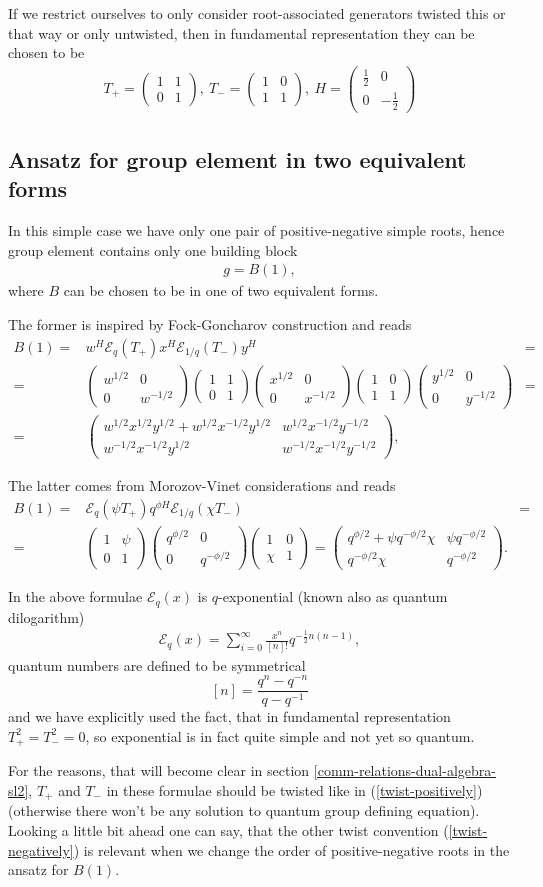 \documentclass{article}
\newcommand{\lb}{\left (}
\newcommand{\rb}{\right )}
\newcommand{\be}{\begin{eqnarray}}
\newcommand{\ee}{\end{eqnarray}}
\newcommand {\?}{\textit{???}}
\newcommand{\me}[0]{\mathcal{E}}
\newcommand{\matd}[4]{\lb \begin{array}{cc}
#1 & #2 \\ #3 & #4
\end{array} \rb}
\newcommand{\delabel}[1]{(\ref{#1})}
\newcommand{\Honed}[1]{\lb \begin{array}{ccc}
#1^{1/2} & 0 \\ 0 & #1^{-1/2}
\end{array} \rb}
\newcommand{\Eoned}[1]{\lb \begin{array}{cc}
1 & #1 \\ 0 & 1
\end{array} \rb}
\newcommand{\Foned}[1]{\lb \begin{array}{cc}
1 & 0 \\ #1 & 1
\end{array} \rb}
\begin{document}
If we restrict ourselves to only consider root-associated generators twisted this or that way or only untwisted,
then in fundamental representation they can be chosen to be
\be
T_+ = \Eoned{1},\ T_- = \Foned{1},\ H = \matd{\frac{1}{2}}{0}{0}{-\frac{1}{2}}
\ee

\subsection{Ansatz for group element in two equivalent forms}
In this simple case we have only one pair of positive-negative simple roots, hence group
element contains only one building block
\be
\label{quantum-group-element-sl2}
g = B(1),
\ee
where $B$ can be chosen to be in one of two equivalent forms.

The former is inspired by Fock-Goncharov construction and reads
\be
\label{building-block-sl2-fg}
B(1) = & w^H \me_q \lb T_+\rb x^H \me_{1/q} \lb T_- \rb y^H & = \\
= & \Honed{w} \Eoned{1} \Honed{x} \Foned{1} \Honed{y} & = \nonumber \\
= & \matd{w^{1/2}x^{1/2}y^{1/2} + w^{1/2}x^{-1/2}y^{1/2}}{w^{1/2}x^{-1/2}y^{-1/2}}
{w^{-1/2}x^{-1/2}y^{1/2}}{w^{-1/2}x^{-1/2}y^{-1/2}} \nonumber,
\ee

The latter comes from Morozov-Vinet considerations and reads
\be
\label{building-block-sl2-mv}
B(1) = & \me_q \lb \psi T_+ \rb q^{\phi H} \me_{1/q} \lb \chi T_- \rb & = \\
= & \Eoned{\psi} \matd{q^{\phi/2}}{0}{0}{q^{-\phi/2}} \Foned{\chi} = \matd{q^{\phi/2} + \psi q^{-\phi/2}\chi}{\psi q^{-\phi/2}}{q^{-\phi/2}\chi}{q^{-\phi/2}} \nonumber.
\ee

In the above formulae $\me_q(x)$ is $q$-exponential (known also as quantum dilogarithm)
\be
\me_q(x) = \sum_{i = 0}^\infty \frac{x^n}{[n]!} q^{-\frac{1}{2}n(n-1)},
\ee
quantum numbers are defined to be symmetrical
$$[n] = \frac{q^n - q^{-n}}{q - q^{-1}}$$
and we have explicitly used the fact, that in fundamental representation $T_+^2 = T_-^2 = 0$,
so exponential is in fact quite simple and not yet so quantum.

For the reasons, that will become clear in section \ref{comm-relations-dual-algebra-sl2},
$T_+$ and $T_-$ in these formulae should be twisted like in \delabel{twist-positively}
(otherwise there won't be any solution to quantum group defining equation).
Looking a little bit ahead one can say, that the other twist convention \delabel{twist-negatively}
is relevant when we change the order of positive-negative roots in the ansatz for $B(1)$.
\end{document}
